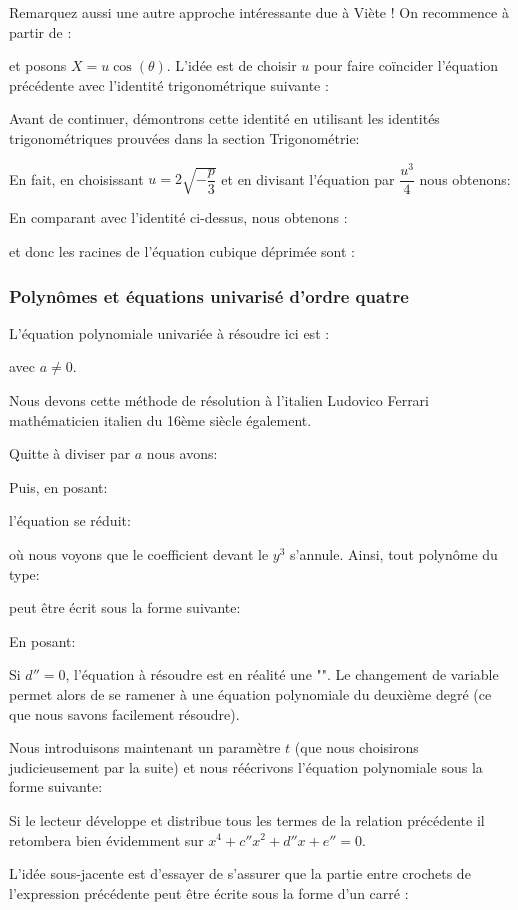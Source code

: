 	Remarquez aussi une autre approche intéressante due à Viète ! On recommence à partir de :
	
	et posons $X = u\cos(\theta)$. L'idée est de choisir $u$ pour faire coïncider l'équation précédente avec l'identité trigonométrique suivante :
	
	Avant de continuer, démontrons cette identité en utilisant les identités trigonométriques prouvées dans la section Trigonométrie:
	
	En fait, en choisissant $u=2\sqrt{-{\dfrac {p}{3}}}$ et en divisant l'équation par $\dfrac{u^{3}}{4}$ nous obtenons:
	
	En comparant avec l'identité ci-dessus, nous obtenons :
	
	et donc les racines de l'équation cubique déprimée sont :
	
	
	\subsubsection{Polynômes et équations univarisé d'ordre quatre}
	L'équation polynomiale univariée à résoudre ici est :
	
	avec $a\neq 0$.
	\begin{tcolorbox}[title=Remarque,colframe=black,arc=10pt]
	Nous devons cette méthode de résolution à l'italien Ludovico Ferrari mathématicien italien du 16ème siècle également.
	\end{tcolorbox}
	Quitte à diviser par $a$ nous avons:
	
	Puis, en posant:
	
	l'équation se réduit:
	
	où nous voyons que le coefficient devant le $y^3$ s'annule. Ainsi, tout polynôme du type:
	
	peut être écrit sous la forme suivante:
	
	En posant:
	
	\begin{tcolorbox}[title=Remarque,colframe=black,arc=10pt]
	Si $d''=0$, l'équation à résoudre est en réalité une "". Le changement de variable permet alors de se ramener à une équation polynomiale du deuxième degré (ce que nous savons facilement résoudre).
	\end{tcolorbox}
	Nous introduisons maintenant un paramètre $t$ (que nous choisirons judicieusement par la suite) et nous réécrivons l'équation polynomiale sous la forme suivante:
	
	\begin{tcolorbox}[title=Remarque,colframe=black,arc=10pt]
	Si le lecteur développe et distribue tous les termes de la relation précédente il retombera bien évidemment sur $x^4+c''x^2+d''x+e''=0$.
	\end{tcolorbox}
	L'idée sous-jacente est d'essayer de s'assurer que la partie entre crochets de l'expression précédente peut être écrite sous la forme d'un carré :
	
